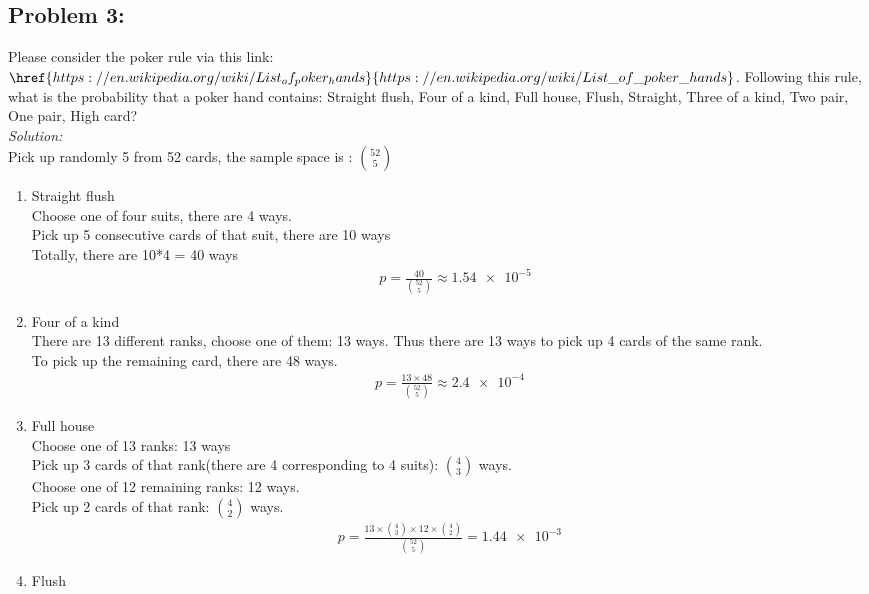 \documentclass[a4paper]{article}
\begin{document}
\subsection*{Problem 3:}
Please consider the poker rule via this link: $\href{https://en.wikipedia.org/wiki/List_of_poker_hands}{https://en.wikipedia.org/wiki/List\_of\_poker\_hands}$. Following this rule, what is the probability that a poker hand contains: Straight flush, Four of a kind, Full house, Flush, Straight, Three of a kind, Two pair, One pair, High card? \\
\textit{Solution:}\\
Pick up randomly 5 from 52 cards, the sample space is :  ${52 \choose 5}$
\begin{enumerate}
	\item Straight flush\\
	      Choose one of four suits, there are 4 ways. \\
	      Pick up 5 consecutive cards of that suit, there are 10 ways \\
	      Totally, there are 10*4 = 40 ways
	      \begin{align*}
		       & p = \frac{40}{{52\choose 5}} \approx \num{1.54e-5}
	      \end{align*}
	\item Four of a kind \\
	      There are 13 different ranks, choose one of them: 13 ways.
	      Thus there are 13 ways to pick up 4 cards of the same rank. \\
	      To pick up the remaining card, there are 48 ways.
	      \begin{align*}
		      p = \frac{13\times48}{{52\choose 5}} \approx \num{2.4e-4}
	      \end{align*}
	\item Full house \\
	      Choose one of 13 ranks: 13 ways \\
	      Pick up 3 cards of that rank(there are 4 corresponding to 4 suits): ${4 \choose 3}$ ways. \\
	      Choose one of 12 remaining ranks: 12 ways. \\
	      Pick up 2 cards of that rank: ${4\choose 2}$ ways. \\
	      \begin{align*}
		      p = \frac{13 \times {4\choose 3} \times 12 \times {4 \choose 2}}{{52 \choose 5}} = \num{1.44e-3}
	      \end{align*}
	\item Flush \\

\end{enumerate}
\end{document}
